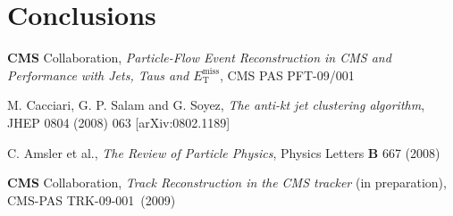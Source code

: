 \documentclass{cmspaper}
\begin{document}
\section{Conclusions}

\begin{thebibliography}{99}


 {\bf CMS} Collaboration, {\em Particle-Flow Event Reconstruction in CMS and Performance with Jets, Taus and $E_{\mathrm{T}}^{\mathrm{miss}}$}, CMS PAS PFT-09/001

 M. Cacciari, G. P. Salam and G. Soyez, {\em The anti-kt jet clustering algorithm}, JHEP 0804 (2008) 063 [arXiv:0802.1189]

 C. Amsler et al., {\em The Review of Particle Physics}, Physics Letters {\bf B} 667 (2008)

 {\bf CMS} Collaboration, {\em Track Reconstruction in the CMS tracker} (in preparation), CMS-PAS TRK-09-001~(2009)

\end{thebibliography}
%
%
%
%
%
%
%
%
%
\end{document}
